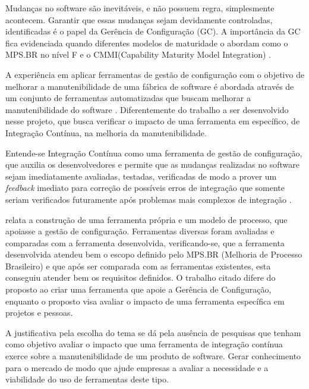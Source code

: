 Mudanças no software são inevitáveis, e não possuem regra, simplesmente acontecem. Garantir que essas mudanças sejam devidamente controladas, identificadas é o papel da  Gerência de Configuração (GC). A importância da GC fica evidenciada quando diferentes modelos de maturidade o abordam como o MPS.BR no nível F e o CMMI(Capability Maturity Model Integration) \cite{furlaneto2006}.

A experiência em aplicar ferramentas  de gestão de configuração com o objetivo de melhorar a manutenibilidade de uma fábrica de software é abordada através de um conjunto de ferramentas automatizadas que buscam melhorar a manutenibilidade do software \cite{poliana2005}. Diferentemente do trabalho a ser desenvolvido nesse projeto, que busca verificar o impacto de uma ferramenta em específico, de Integração Contínua,  na melhoria da manutenibilidade.

Entende-se Integração Contínua como uma ferramenta de gestão de configuração, que auxilia os desenvolvedores e permite que as mudanças realizadas no software sejam imediatamente avaliadas, testadas, verificadas de modo a prover um  \textit{feedback} imediato para correção de possíveis erros de integração que somente seriam verificados futuramente após problemas mais complexos de integração \cite{paul2007}.

 relata a construção de uma ferramenta própria e um modelo de processo, que apoiasse a gestão de configuração. Ferramentas diversas foram avaliadas e comparadas com a ferramenta desenvolvida, verificando-se, que a ferramenta desenvolvida atendeu bem o escopo definido pelo MPS.BR (Melhoria de Processo Brasileiro) e que após ser comparada com as ferramentas existentes, esta conseguiu atender bem os requisitos definidos. O trabalho citado difere do proposto ao criar uma ferramenta que apoie a Gerência de Configuração, enquanto o proposto visa avaliar o impacto de uma ferramenta específica em projetos e pessoas.

A justificativa pela escolha do tema se dá pela ausência de pesquisas que tenham como objetivo avaliar o impacto que uma ferramenta de integração contínua exerce sobre a manutenibilidade de um produto de software. Gerar conhecimento para o mercado de modo que ajude empresas a avaliar a necessidade e a viabilidade do uso de ferramentas deste tipo.